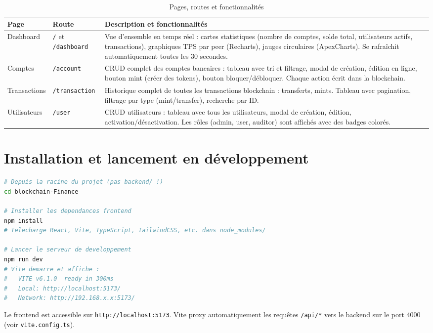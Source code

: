 \documentclass[12pt,a4paper,twoside]{report}
\begin{document}
\begin{table}[H]
\centering
\begin{tabularx}{\textwidth}{llX}
\toprule
\textbf{Page} & \textbf{Route} & \textbf{Description et fonctionnalités} \\
\midrule
Dashboard & \texttt{/} et \texttt{/dashboard} & Vue d'ensemble en temps réel : cartes statistiques (nombre de comptes, solde total, utilisateurs actifs, transactions), graphiques TPS par peer (Recharts), jauges circulaires (ApexCharts). Se rafraîchit automatiquement toutes les 30 secondes. \\
Comptes & \texttt{/account} & CRUD complet des comptes bancaires : tableau avec tri et filtrage, modal de création, édition en ligne, bouton mint (créer des tokens), bouton bloquer/débloquer. Chaque action écrit dans la blockchain. \\
Transactions & \texttt{/transaction} & Historique complet de toutes les transactions blockchain : transferts, mints. Tableau avec pagination, filtrage par type (mint/transfer), recherche par ID. \\
Utilisateurs & \texttt{/user} & CRUD utilisateurs : tableau avec tous les utilisateurs, modal de création, édition, activation/désactivation. Les rôles (admin, user, auditor) sont affichés avec des badges colorés. \\
\bottomrule
\end{tabularx}
\caption{Pages, routes et fonctionnalités}
\end{table}

\section{Installation et lancement en développement}

\begin{lstlisting}[language=bash, caption=Lancement du frontend en dev]
# Depuis la racine du projet (pas backend/ !)
cd blockchain-Finance

# Installer les dependances frontend
npm install
# Telecharge React, Vite, TypeScript, TailwindCSS, etc. dans node_modules/

# Lancer le serveur de developpement
npm run dev
# Vite demarre et affiche :
#   VITE v6.1.0  ready in 300ms
#   Local: http://localhost:5173/
#   Network: http://192.168.x.x:5173/
\end{lstlisting}

Le frontend est accessible sur \texttt{http://localhost:5173}. Vite proxy automatiquement les requêtes \texttt{/api/*} vers le backend sur le port 4000 (voir \texttt{vite.config.ts}).
\end{document}
